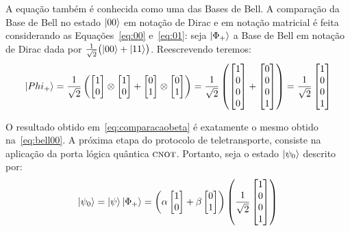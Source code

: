 A equação também é conhecida como uma das Bases de Bell. A comparação da Base de Bell no estado $\ket{00}$ em notação de Dirac e em notação matricial é feita considerando as Equações~\eqref{eq:00} e~\eqref{eq:01}: seja \(\ket{\Phi_+}\) a Base de Bell em notação de Dirac dada por \(\frac{1}{\sqrt{2}} \bigl(\ket{00} + \ket{11}\bigr)\). Reescrevendo teremos:
\begin{equation}\label{eq:comparacaobeta}
\ket{\\Phi_+} = \frac{1}{\sqrt{2}} \left( \begin{bmatrix}
1 \\
0
\end{bmatrix} \otimes \begin{bmatrix}
1 \\
0
\end{bmatrix} + \begin{bmatrix}
0 \\
1
\end{bmatrix} \otimes \begin{bmatrix}
0 \\
1
\end{bmatrix}\right) = \frac{1}{\sqrt{2}} \left( \begin{bmatrix}
1 \\
0 \\
0 \\
0 
\end{bmatrix} + \begin{bmatrix}
0 \\
0 \\
0 \\
1 
\end{bmatrix}\right) = \frac{1}{\sqrt{2}} \begin{bmatrix}
1 \\
0 \\
0 \\
1 
\end{bmatrix}
\end{equation}

O resultado obtido em~\eqref{eq:comparacaobeta} é exatamente o mesmo obtido na~\eqref{eq:bell00}. A próxima etapa do protocolo de teletransporte, consiste na aplicação da porta lógica quântica \(\operatorname{\textsc{cnot}}\). Portanto, seja o estado $\ket{\psi_0}$ descrito por:
\begin{equation}\label{eq:psi0}
\ket{\psi_0}=\ket{\psi}\ket{\Phi_+}=\left(\alpha \begin{bmatrix}
1 \\
0 
\end{bmatrix} + \beta \begin{bmatrix}
0 \\
1
\end{bmatrix}\right) \left(\frac{1}{\sqrt{2}} \begin{bmatrix}
1 \\
0 \\
0 \\
1
\end{bmatrix}\right)
\end{equation}

